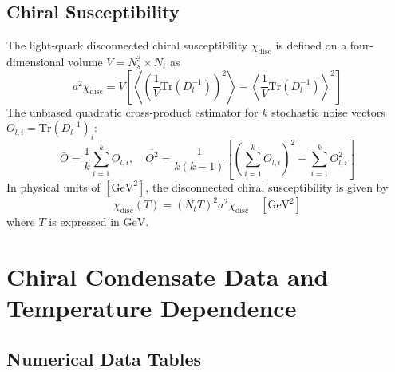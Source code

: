 \documentclass[11pt,a4paper]{article}
\begin{document}
\subsection{Chiral Susceptibility}
The light-quark disconnected chiral susceptibility $\chi_{\text{disc}}$ is defined on a four-dimensional volume $V = N_s^3 \times N_t$ as
\begin{equation}
a^2\chi_{\text{disc}} = V \left[ \left\langle \left( \frac{1}{V} \text{Tr}(D_l^{-1}) \right)^2 \right\rangle - \left\langle \frac{1}{V} \text{Tr}(D_l^{-1}) \right\rangle^2 \right]
\end{equation}
The unbiased quadratic cross-product estimator for $k$ stochastic noise vectors $O_{l, i} = \text{Tr}(D_l^{-1})_i$:
\begin{equation}
\bar{O} = \frac{1}{k} \sum_{i=1}^k O_{l, i}, \quad \overline{O^2} = \frac{1}{k(k-1)} \left[ \left(\sum_{i=1}^k O_{l, i}\right)^2 - \sum_{i=1}^k O_{l, i}^2 \right]
\end{equation}
In physical units of $[\text{GeV}^2]$, the disconnected chiral susceptibility is given by
\begin{equation}
\chi_{\text{disc}}(T) = (N_t T)^2 a^2\chi_{\text{disc}} \quad [\text{GeV}^2]
\end{equation}
where $T$ is expressed in $\text{GeV}$.

\section{Chiral Condensate Data and Temperature Dependence}

\subsection{Numerical Data Tables}
\end{document}

